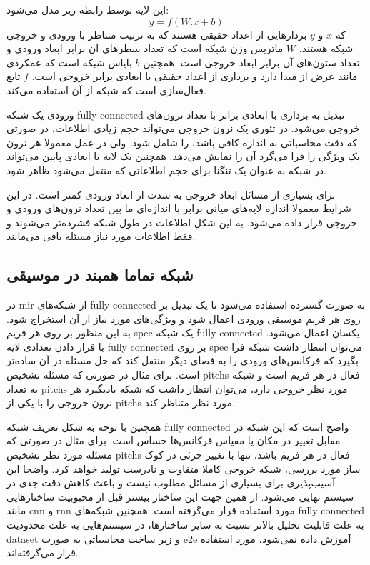 این لایه توسط رابطه زیر مدل می‌شود:
\begin{equation}
    y = f(W.x + b)
\end{equation}
که $x$ و $y$ بردارهایی از اعداد حقیقی هستند که به ترتیب متناظر با ورودی و خروجی
شبکه هستند. $W$ ماتریس وزن شبکه است که تعداد سطرهای آن برابر ابعاد ورودی و تعداد
ستون‌های آن برابر ابعاد خروجی است. همچنین $b$ بایاس شبکه است که عمکردی مانند عرض
از مبدا دارد و برداری از اعداد حقیقی با ابعادی برابر خروجی است. $f$ تابع
فعال‌سازی است که شبکه از آن استفاده می‌کند.

ورودی یک شبکه \gls{fully connected} تبدیل به برداری با ابعادی برابر با تعداد
نرون‌های خروجی می‌شود. در تئوری یک نرون خروجی می‌تواند حجم زیادی اطلاعات، در
صورتی که دقت محاسباتی به اندازه کافی باشد، را شامل شود. ولی در عمل معمولا هر
نرون یک ویژگی را فرا می‌گرد آن را نمایش می‌دهد. همچنین یک لایه با ابعادی پایین
می‌تواند در شبکه به عنوان یک تنگنا برای حجم اطلاعاتی که منتقل می‌شود ظاهر شود.

برای بسیاری از مسائل ابعاد خروجی به شدت از ابعاد ورودی کمتر است. در این شرایط
معمولا اندازه لایه‌های میانی برابر با اندازه‌ای ما بین تعداد نرون‌های ورودی و
خروجی قرار داده می‌شود. به این شکل اطلاعات در طول شبکه فشرده‌تر می‌شوند و فقط
اطلاعات مورد نیاز مسئله باقی می‌مانند.

\subsection{شبکه تماما همبند در موسیقی}
در \gls{mir} از شبکه‌های \gls{fully connected} به صورت گسترده استفاده می‌شود تا
یک تبدیل بر روی هر فریم موسیقی ورودی اعمال شود و ویژگی‌های مورد نیاز از آن
استخراج شود. به این منظور بر روی هر فریم \gls{spec} یک شبکه \gls{fully
connected} یکسان اعمال می‌شود. با قرار دادن تعدادی لایه \gls{fully connected} بر
روی \gls{spec} می‌توان انتظار داشت شبکه فرا بگیرد که فرکانس‌های ورودی را به فضای
دیگر منتقل کند که حل مسئله در آن ساده‌تر است. برای مثال در صورتی که مسئله تشخیص
\glspl{pitch} فعال در هر فریم است و شبکه به تعداد \glspl{pitch} مورد نظر خروجی
دارد، می‌توان انتظار داشت که شبکه یادبگیرد هر نرون خروجی را با یکی از
\glspl{pitch} مورد نظر متناظر کند.

همچنین با توجه به شکل تعریف شبکه \gls{fully connected} واضح است که این شبکه در
مقابل تغییر در مکان یا مقیاس فرکانس‌ها حساس است. برای مثال در صورتی که مسئله
مورد نظر تشخیص \glspl{pitch} فعال در هر فریم باشد، تنها با تغییر جزئی در کوک ساز
مورد بررسی، شبکه خروجی کاملا متفاوت و نادرست تولید خواهد کرد. واضحا این
آسیب‌پذیری برای بسیاری از مسائل مطلوب نیست و باعث کاهش دقت جدی در سیستم نهایی
می‌شود. از همین جهت این ساختار بیشتر قبل از محبوبیت ساختارهایی مانند \gls{cnn} و
\gls{rnn} مورد استفاده قرار می‌گرفته است. همچنین شبکه‌های \gls{fully connected}
به علت قابلیت تحلیل بالاتر نسبت به سایر ساختارها، در سیستم‌هایی به علت محدودیت
\gls{dataset} و زیر ساخت محاسباتی به صورت \gls{e2e} آموزش داده نمی‌شود، مورد
استفاده قرار می‌گرفته‌اند.

